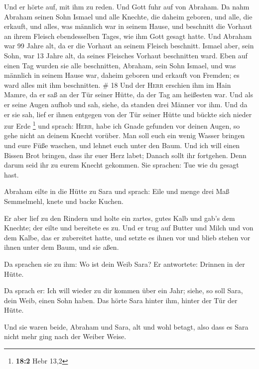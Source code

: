  Und er hörte auf, mit ihm zu reden. Und Gott fuhr auf
von Abraham.  Da nahm Abraham seinen Sohn Ismael und alle
Knechte, die daheim geboren, und alle, die erkauft, und alles, was
männlich war in seinem Hause, und beschnitt die Vorhaut an ihrem Fleisch
ebendesselben Tages, wie ihm Gott gesagt hatte.  Und
Abraham war 99 Jahre alt, da er die Vorhaut an seinem Fleisch beschnitt.
 Ismael aber, sein Sohn, war 13 Jahre alt, da seines
Fleisches Vorhaut beschnitten ward.  Eben auf einen Tag
wurden sie alle beschnitten, Abraham, sein Sohn Ismael, 
und was männlich in seinem Hause war, daheim geboren und erkauft von
Fremden; es ward alles mit ihm beschnitten. \# 18  Und der
\textsc{Herr} erschien ihm im Hain Mamre, da er saß an der Tür seiner
Hütte, da der Tag am heißesten war.  Und als er seine
Augen aufhob und sah, siehe, da standen drei Männer vor ihm. Und da er
sie sah, lief er ihnen entgegen von der Tür seiner Hütte und bückte sich
nieder zur Erde \footnote{\textbf{18:2} Hebr 13,2}  und
sprach: \textsc{Herr}, habe ich Gnade gefunden vor deinen Augen, so gehe
nicht an deinem Knecht vorüber.  Man soll euch ein wenig
Wasser bringen und eure Füße waschen, und lehnet euch unter den Baum.
 Und ich will einen Bissen Brot bringen, dass ihr euer
Herz labet; Danach sollt ihr fortgehen. Denn darum seid ihr zu eurem
Knecht gekommen. Sie sprachen: Tue wie du gesagt hast.

 Abraham eilte in die Hütte zu Sara und sprach: Eile und
menge drei Maß Semmelmehl, knete und backe Kuchen.

 Er aber lief zu den Rindern und holte ein zartes, gutes
Kalb und gab's dem Knechte; der eilte und bereitete es zu.
 Und er trug auf Butter und Milch und von dem Kalbe, das
er zubereitet hatte, und setzte es ihnen vor und blieb stehen vor ihnen
unter dem Baum, und sie aßen.

 Da sprachen sie zu ihm: Wo ist dein Weib Sara? Er
antwortete: Drinnen in der Hütte.

 Da sprach er: Ich will wieder zu dir kommen über ein
Jahr; siehe, so soll Sara, dein Weib, einen Sohn haben. Das hörte Sara
hinter ihm, hinter der Tür der Hütte.

 Und sie waren beide, Abraham und Sara, alt und wohl
betagt, also dass es Sara nicht mehr ging nach der Weiber Weise.


